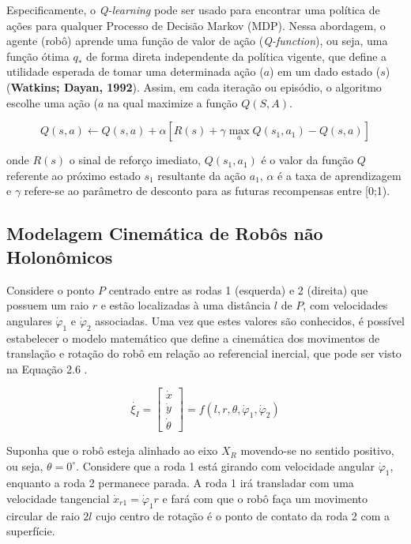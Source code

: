 \documentclass[a4paper]{ifacconf}
\begin{document}
Especificamente, o \emph{Q-learning} pode ser usado para encontrar uma política de ações para qualquer Processo de Decisão Markov (MDP). Nessa abordagem, o agente (robô) aprende uma função de valor de ação (\emph{Q-function}), ou seja, uma função ótima $q_{*}$ de forma direta independente da política vigente, que define a utilidade esperada de tomar uma determinada ação ($a$) em um dado estado ($s$) (\textbf{Watkins; Dayan, 1992}). Assim, em cada iteração ou episódio, o algoritmo escolhe uma ação ($a$ na qual maximize a função $Q(S,A)$.

\begin{equation}
Q(s,a) \leftarrow Q(s,a) + \alpha [R(s) + \gamma \max_{a} Q(s_1,a_1) - Q(s,a)]
\end{equation}

onde $R(s)$ o sinal de reforço imediato, $ Q(s_1,a_1)$ é o valor da função $Q$ referente ao próximo estado $s_1$ resultante da ação $a_1$, $\alpha$ é a taxa de aprendizagem e $\gamma$ refere-se ao parâmetro de desconto para as futuras recompensas entre [0;1).

\subsection{Modelagem Cinemática de Robôs não Holonômicos}

Considere o ponto $P$ centrado entre as rodas 1 (esquerda) e 2 (direita) que possuem um raio $r$ e estão localizadas à uma distância $l$ de $P$, com velocidades angulares $\dot{\varphi}_{1}$ e $\dot{\varphi}_{2}$ associadas. Uma vez que estes valores são conhecidos, é possível estabelecer o modelo matemático que define a cinemática dos movimentos de translação e rotação do robô em relação ao referencial inercial, que pode ser visto na Equação 2.6 \cite{intro_to_auto_robots}.

\begin{equation}
\dot{\xi_{I}} =
\begin{bmatrix}
\dot{x} \\
\dot{y} \\
\dot{\theta}
\end{bmatrix}=f(l,r,\theta,\dot{\varphi}_{1},\dot{\varphi}_{2}) 
\end{equation}

Suponha que o robô esteja alinhado ao eixo $X_{R}$ movendo-se no sentido positivo, ou seja, $\theta = 0^{\circ}$. Considere que a roda 1 está girando com velocidade angular $\dot{\varphi}_{1}$, enquanto a roda 2 permanece parada. A roda 1 irá transladar com uma velocidade tangencial $\dot{x}_{r1} = \dot{\varphi}_{1}r$ e fará com que o robô faça um movimento circular de raio $2l$ cujo centro de rotação é o ponto de contato da roda 2 com a superfície.
\end{document}
